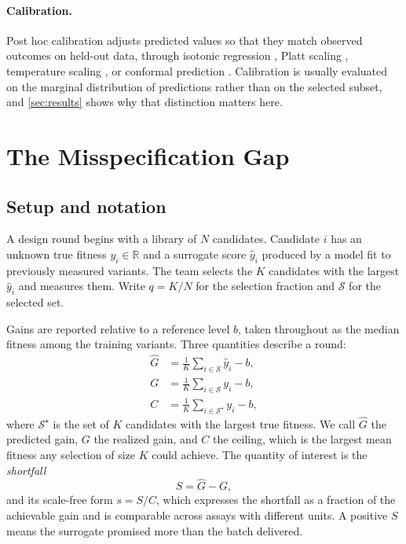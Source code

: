 \documentclass{article}
\theoremstyle{plain}
\theoremstyle{definition}
\newcommand{\yhat}{\hat{y}}
\newcommand{\Real}{\mathbb{R}}
\begin{document}
\paragraph{Calibration.}
Post hoc calibration adjusts predicted values so that they match observed outcomes on
held-out data, through isotonic regression \citep{zadrozny2002transforming}, Platt
scaling \citep{platt1999probabilistic}, temperature scaling
\citep{guo2017calibration}, or conformal prediction \citep{vovk2005algorithmic,
angelopoulos2023conformal}. Calibration is usually evaluated on the marginal
distribution of predictions rather than on the selected subset, and
\cref{sec:results} shows why that distinction matters here.

\section{The Misspecification Gap}
\label{sec:method}

\subsection{Setup and notation}
\label{sec:setup-notation}

A design round begins with a library of $N$ candidates. Candidate $i$ has an unknown
true fitness $y_i \in \Real$ and a surrogate score $\yhat_i$ produced by a model fit to
previously measured variants. The team selects the $K$ candidates with the largest
$\yhat_i$ and measures them. Write $q = K/N$ for the selection fraction and
$\mathcal{S}$ for the selected set.

Gains are reported relative to a reference level $b$, taken throughout as the median
fitness among the training variants. Three quantities describe a round:
\begin{align}
\hat{G} &= \tfrac{1}{K}\textstyle\sum_{i \in \mathcal{S}} \yhat_i - b,
  \label{eq:predgain}\\
G &= \tfrac{1}{K}\textstyle\sum_{i \in \mathcal{S}} y_i - b,
  \label{eq:realgain}\\
C &= \tfrac{1}{K}\textstyle\sum_{i \in \mathcal{S}^\star} y_i - b,
  \label{eq:ceiling}
\end{align}
where $\mathcal{S}^\star$ is the set of $K$ candidates with the largest true fitness.
We call $\hat{G}$ the predicted gain, $G$ the realized gain, and $C$ the ceiling, which
is the largest mean fitness any selection of size $K$ could achieve. The quantity of
interest is the \emph{shortfall}
\begin{equation}
S = \hat{G} - G,
\label{eq:shortfall}
\end{equation}
and its scale-free form $s = S/C$, which expresses the shortfall as a fraction of the
achievable gain and is comparable across assays with different units. A positive $S$
means the surrogate promised more than the batch delivered.
\end{document}
